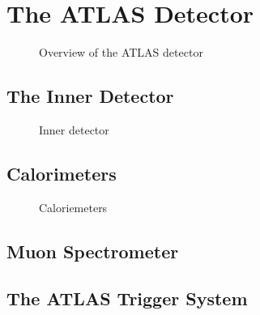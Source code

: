 \section{The ATLAS Detector}

\cite{PERF-2007-01}

\begin{figure}[htbp]
  \centering

  \caption{Overview of the ATLAS detector}
  \label{fig:atlas_detector_overview}
\end{figure}

\subsection{The Inner Detector}

\begin{figure}[htbp]
  \centering

  \caption{Inner detector}
  \label{fig:atlas_inner_detector}
\end{figure}


\subsection{Calorimeters}

\begin{figure}[htbp]
  \centering

  \caption{Caloriemeters}
  \label{fig:atlas_calorimeters}
\end{figure}


\subsection{Muon Spectrometer}

\subsection{The ATLAS Trigger System}

